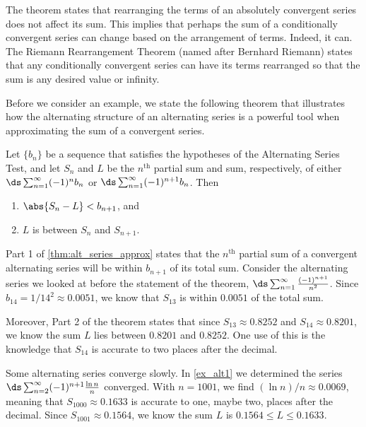 The theorem states that rearranging the terms of an absolutely convergent series does not affect its sum. This implies that perhaps the sum of a conditionally convergent series can change based on the arrangement of terms. Indeed, it can. The Riemann Rearrangement Theorem (named after Bernhard Riemann) states that any conditionally convergent series can have its terms rearranged so that the sum is any desired value or infinity.

Before we consider an example, we state the following theorem that illustrates how the alternating structure of an alternating series is a powerful tool when approximating the sum of a convergent series.

\begin{theorem}\label{thm:alt_series_approx}%
Let $\{b_n\}$ be a sequence that satisfies the hypotheses of the Alternating Series Test, and let $S_n$ and $L$ be the $n^\text{th}$ partial sum and sum, respectively, of either $\ds \sum_{n=1}^\infty (-1)^{n}b_n$ or $\ds \sum_{n=1}^\infty (-1)^{n+1}b_n$. Then
\begin{enumerate}
	\item $\abs{S_n-L} < b_{n+1}$, and
	\item	$L$ is between $S_n$ and $S_{n+1}$.
\end{enumerate}
\end{theorem}

Part 1 of \autoref{thm:alt_series_approx} states that the $n^\text{th}$ partial sum of a convergent alternating series will be within $b_{n+1}$ of its total sum. Consider the alternating series we looked at before the statement of the theorem, $\ds \sum_{n=1}^\infty \frac{(-1)^{n+1}}{n^2}$. Since $b_{14} = 1/14^2 \approx 0.0051$, we know that $S_{13}$ is within $0.0051$ of the total sum. 

Moreover, Part 2 of the theorem states that since $S_{13} \approx 0.8252$ and $S_{14}\approx 0.8201$, we know the sum $L$ lies between $0.8201$ and $0.8252$. One use of this is the knowledge that $S_{14}$ is accurate to two places after the decimal.

Some alternating series converge slowly. In \autoref{ex_alt1} we determined the series $\ds\sum_{n=2}^\infty (-1)^{n+1}\frac{\ln n}{n}$ converged. With $n=1001$, we find $(\ln n)/n \approx 0.0069$, meaning that $S_{1000} \approx 0.1633$ is accurate to one, maybe two, places after the decimal. Since $S_{1001} \approx 0.1564$, we know the sum $L$ is $0.1564\leq L\leq0.1633$.

